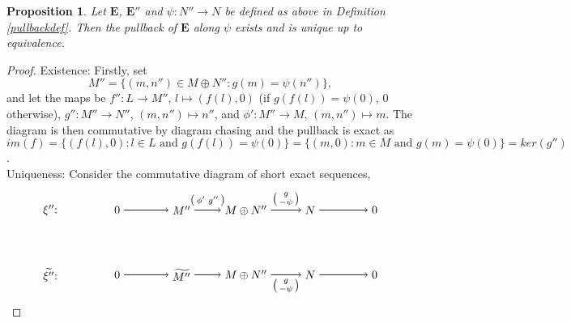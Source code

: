 \documentclass[11.5pt, twoside, a4paper, titlepage]{report}
\theoremstyle{definition}
\theoremstyle{plain}
\newtheorem{prop}[mydef]{Proposition}
\begin{document}
\begin{prop} \label{pullbackprop}
Let $\mathbf{E}$, $\mathbf{E''}$ and $\psi: N''\to N$ be defined as above in Definition \ref{pullbackdef}. Then the pullback of $\mathbf{E}$ along $\psi$ exists and is unique up to equivalence.
\end{prop}
\begin{proof}
Existence: Firstly, set
\begin{equation*}
M''=\{(m,n'')\in M\oplus N'': g(m)=\psi(n'')\},
\end{equation*}
and let the maps be $f'': L \to M''$, $l\mapsto (f(l),0)$ (if $g(f(l))=\psi(0)$, $0$ otherwise), $g'': M'' \to N''$, $(m, n'') \mapsto n''$, and $\phi': M'' \to M$, $(m, n'') \mapsto m$. The diagram is then commutative by diagram chasing and the pullback is exact as $im(f)=\{(f(l),0):l\in L\text{ and } g(f(l))=\psi(0)\}=\{(m, 0): m \in M\text{ and }g(m)=\psi(0)\}=ker(g'')$. \\
Uniqueness: Consider the commutative diagram of short exact sequences,
\begin{equation*}
\begin{tikzpicture}[->,-latex, auto, main path/.style={->, semithick}, main node/.style={}]
\node	[main node]		(1) at (0,0)		{$\mathbf{\xi''}$: \quad };
\node	[main node]		(2) at (2,0)		{$0$};
\node	[main node]		(3) at (4,0)		{$M''$};
\node [main node]		(4) at (6,0)		{$M\oplus N''$};
\node [main node]		(5) at (8,0)		{$N$};
\node	[main node]		(11) at (10,0)	{$0$};

\node	[main node]		(6) at (0,-2)		{$\widetilde{\mathbf{\xi''}}$: \quad};
\node	[main node]		(7) at (2,-2)		{$0$};
\node	[main node]		(8) at (4,-2)		{$\widetilde{M''}$};
\node [main node]		(9) at (6,-2)		{$M\oplus N''$};
\node [main node]		(10) at (8,-2)	{$N$};
\node [main node]		(13) at (10,-2)	{$0$};

\draw (2) edge [main path] node [auto] {$$} (3);
\draw (3) edge [main path] node [auto] {$\begin{psmallmatrix}\phi' & g''\end{psmallmatrix}$} (4);
\draw (4) edge [main path] node [auto] {$\begin{psmallmatrix}g \\ -\psi \end{psmallmatrix}$} (5);
\draw (5) edge [main path] (11);

\draw (7) edge [main path] node [auto] {$$} (8);
\draw (8) edge [main path] node [auto, swap] {$$} (9);
\draw (9) edge [main path] node [auto, swap] {$\begin{psmallmatrix}g \\ -\psi \end{psmallmatrix}$} (10);
\draw (10) edge [main path] (13);


\end{tikzpicture}
\end{equation*}
\end{proof}
\end{document}
